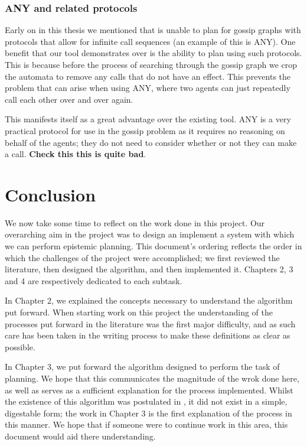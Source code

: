 \documentclass[10pt, a4paper]{report}
\begin{document}
\subsection{\textsf{ANY} and related protocols}

Early on in this thesis we mentioned that \cite{GithubGossip} is unable to plan
for gossip graphs with protocols that allow for infinite call sequences (an
example of this is \textsf{ANY}). One benefit that our tool demonstrates over
\cite{GithubGossip} is the ability to plan using such protocols. This is because
before the process of searching through the gossip graph we crop the automata to
remove any calls that do not have an effect. This prevents the problem that can
arise when using \textsf{ANY}, where two agents can just repeatedly call each
other over and over again. 

This manifests itself as a great advantage over the existing tool. \textsf{ANY}
is a very practical protocol for use in the gossip problem as it requires no
reasoning on behalf of the agents; they do not need to consider whether or not
they can make a call. \textbf{Check this this is quite bad}.

\newpage

\chapter{Conclusion}

We now take some time to reflect on the work done in this project. Our
overarching aim in the project was to design an implement a system with which we
can perform epistemic planning. This document's ordering reflects the order in
which the challenges of the project were accomplished; we first reviewed the
literature, then designed the algorithm, and then implemented it. Chapters 2, 3
and 4 are respectively dedicated to each subtask.

In Chapter 2, we explained the concepts necessary to understand the algorithm
put forward. When starting work on this project the understanding of the
processes put forward in the literature was the first major difficulty, and as
such care has been taken in the writing process to make these definitions as clear
as possible. 

In Chapter 3, we put forward the algorithm designed to perform the task of
planning. We hope that this communicates the magnitude of the wrok done here, as
well as serves as a sufficient explanation for the process implemented. Whilst
the existence of this algorithm was postulated in \cite{AutomataTechniques}, it
did not exist in a simple, digestable form; the work in Chapter 3 is the first
explanation of the process in this manner. We hope that if someone were to
continue work in this area, this document would aid there understanding. 
\end{document}

